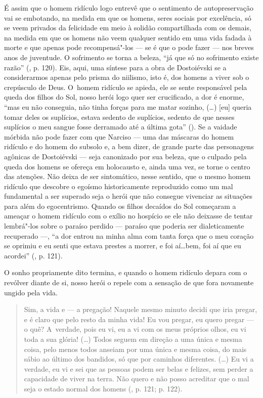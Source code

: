 É assim que o homem ridículo logo entrevê que o sentimento de
autopreservação vai se embotando, na medida em que os homens, seres
sociais por excelência, só se veem privados da felicidade em meio à
solidão compartilhada com os demais, na medida em que os homens não veem
qualquer sentido em uma vida fadada à morte e que apenas pode
recompensá"-los --- se é que o pode fazer --- nos breves anos de juventude.
O sofrimento se torna a beleza, ``já que só no sofrimento existe razão''
(, p. 120). Eis, aqui, uma síntese para a obra de Dostoiévski se a
considerarmos apenas pelo prisma do niilismo, isto é, dos homens a viver
sob o crepúsculo de Deus. O~homem ridículo se apieda, ele se sente
responsável pela queda dos filhos do Sol, nosso herói logo quer ser
crucificado, a dor é enorme, ``mas eu não conseguia, não tinha forças
para me matar sozinho, (\ldots) {[}eu{]} queria tomar deles os suplícios,
estava sedento de suplícios, sedento de que nesses suplícios o meu
sangue fosse derramado até a última gota'' (). Se a vaidade
mórbida não pode fazer com que Narciso --- uma das máscaras do homem
ridículo e do homem do subsolo e, a bem dizer, de grande parte das
personagens agônicas de Dostoiévski --- seja canonizado por sua beleza,
que o culpado pela queda dos homens se ofereça em holocausto e, ainda
uma vez, se torne o centro das atenções. Não deixa de ser sintomático,
nesse sentido, que o mesmo homem ridículo que descobre o egoísmo
historicamente reproduzido como um mal fundamental a ser superado seja o
herói que não consegue vivenciar as situações para além do egocentrismo.
Quando os filhos decaídos do Sol começaram a ameaçar o homem ridículo
com o exílio no hospício se ele não deixasse de tentar lembrá"-los sobre
o paraíso perdido --- paraíso que poderia ser dialeticamente recuperado
---, ``a dor entrou na minha alma com tanta força que o meu coração se
oprimiu e eu senti que estava prestes a morrer, e foi aí\ldots bem, foi aí
que eu acordei'' (, p. 121).

O sonho propriamente dito termina, e quando o homem ridículo depara com
o revólver diante de si, nosso herói o repele com a sensação de que fora
novamente ungido pela vida.

\begin{quote}
Sim, a vida e --- a pregação! Naquele mesmo minuto decidi que iria
pregar, e é claro que pelo resto da minha vida! Eu vou pregar, eu quero
pregar --- o quê? A~verdade, pois eu vi, eu a vi com os meus próprios
olhos, eu vi toda a sua glória! (\ldots) Todos seguem em direção a uma
única e mesma coisa, pelo menos todos anseiam por uma única e mesma
coisa, do mais sábio ao último dos bandidos, só que por caminhos
diferentes. (\ldots) Eu vi a verdade, eu vi e sei que as pessoas podem ser
belas e felizes, sem perder a capacidade de viver na terra. Não quero e
não posso acreditar que o mal seja o estado normal dos homens (, p.
121; p. 122).
\end{quote}

